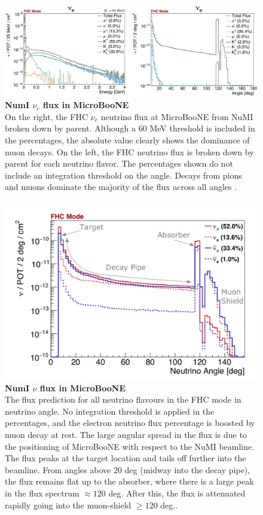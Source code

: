 \begin{figure}[h!]
    \centering
    \includegraphics[width=180mm]{Figures/numi_nue_flux.jpeg}
    \caption[NumI $\nu_e$ flux in MicroBooNE]{{\textbf{NumI $\nu_e$ flux in MicroBooNE}}\\ On the right, the FHC $\nu_e$ neutrino flux at MicroBooNE from NuMI broken down by parent. Although a 60 MeV threshold is included in the percentages, the absolute value clearly shows the dominance of muon decays. On the left, the FHC neutrino flux is broken down by parent for each neutrino flavor. The percentages shown do not include an integration threshold on the angle. Decays from pions and muons dominate the majority of the flux across all angles \cite{krish_phd}.}
    \label{numi_nue_flux}
\end{figure}

\begin{figure}[h!]
    \centering
    \includegraphics[width=130mm]{Figures/numi_nu_flux.jpeg}
    \caption[NumI $\nu$ flux in MicroBooNE]{{\textbf{NumI $\nu$ flux in MicroBooNE}}\\ The flux prediction for all neutrino flavours in the FHC mode in neutrino angle. No integration threshold is applied in the percentages, and the electron neutrino flux percentage is boosted by muon decay at rest. The large angular spread in the flux is due to the positioning of MicroBooNE with respect to the NuMI beamline. The flux peaks at the target location and tails off further into the beamline. From angles above $20$ deg (midway into the decay pipe), the flux remains flat up to the absorber, where there is a large peak in the flux spectrum $\approx 120$ deg. After this, the flux is attenuated rapidly going into the muon-shield $ \ge 120$ deg.\cite{krish_phd}.}
    \label{numi_nu_flux}
\end{figure}

